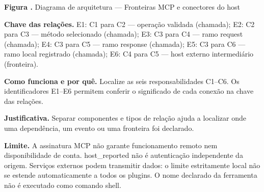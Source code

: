 {\small\textbf{Figura \thefigure.} Diagrama de arquitetura --- Fronteiras MCP e conectores do host}\par\smallskip
{\footnotesize\textbf{Chave das relações.} E1: C1 para C2 --- operação validada (chamada); E2: C2 para C3 --- método selecionado (chamada); E3: C3 para C4 --- ramo request (chamada); E4: C3 para C5 --- ramo response (chamada); E5: C3 para C6 --- ramo local registrado (chamada); E6: C4 para C5 --- host externo intermediário (fronteira).}\par\smallskip
\noindent\textbf{Como funciona e por quê.} Localize as seis responsabilidades C1--C6. Os identificadores E1--E6 permitem conferir o significado de cada conexão na chave das relações.\par
\noindent\textbf{Justificativa.} Separar componentes e tipos de relação ajuda a localizar onde uma dependência, um evento ou uma fronteira foi declarado.\par
\noindent\textbf{Limite.} A assinatura MCP não garante funcionamento remoto nem disponibilidade de conta. host\_reported não é autenticação independente da origem. Serviços externos podem transmitir dados: o limite estritamente local não se estende automaticamente a todos os plugins. O nome declarado da ferramenta não é executado como comando shell.\par\smallskip
{}
